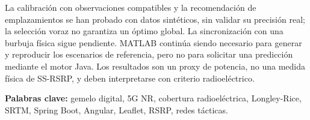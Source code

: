 La calibración con observaciones compatibles y la recomendación de emplazamientos se
han probado con datos sintéticos, sin validar su precisión real; la selección voraz no
garantiza un óptimo global. La sincronización con una burbuja física sigue pendiente.
MATLAB continúa siendo necesario para generar y reproducir los
escenarios de referencia, pero no para solicitar una predicción mediante el motor Java.
Los resultados son un proxy de potencia, no una medida física de SS-RSRP, y deben
interpretarse con criterio radioeléctrico.

\vspace{1em}
\textbf{Palabras clave:} gemelo digital, 5G NR, cobertura radioeléctrica, Longley-Rice,
SRTM, Spring Boot, Angular, Leaflet, RSRP, redes tácticas.
